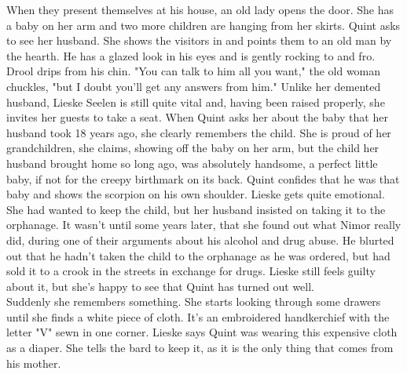 When they present themselves at his house, an old lady opens the door. She has a baby on her arm and two more children are hanging from her skirts. Quint asks to see her husband. She shows the visitors in and points them to an old man by the hearth. He has a glazed look in his eyes and is gently rocking to and fro. Drool drips from his chin. "You can talk to him all you want," the old woman chuckles, "but I doubt you'll get any answers from him." Unlike her demented husband, Lieske Seelen is still quite vital and, having been raised properly, she invites her guests to take a seat. When Quint asks her about the baby that her husband took 18 years ago, she clearly remembers the child. She is proud of her grandchildren, she claims, showing off the baby on her arm, but the child her husband brought home so long ago, was absolutely handsome, a perfect little baby, if not for the creepy birthmark on its back. Quint confides that he was that baby and shows the scorpion on his own shoulder. Lieske gets quite emotional. She had wanted to keep the child, but her husband insisted on taking it to the orphanage. It wasn't until some years later, that she found out what Nimor really did, during one of their arguments about his alcohol and drug abuse. He blurted out that he hadn't taken the child to the orphanage as he was ordered, but had sold it to a crook in the streets in exchange for drugs. Lieske still feels guilty about it, but she's happy to see that Quint has turned out well.\\

Suddenly she remembers something. She starts looking through some drawers until she finds a white piece of cloth. It's an embroidered handkerchief with the letter "V" sewn in one corner. Lieske says Quint was wearing this expensive cloth as a diaper. She tells the bard to keep it, as it is the only thing that comes from his mother.\\

